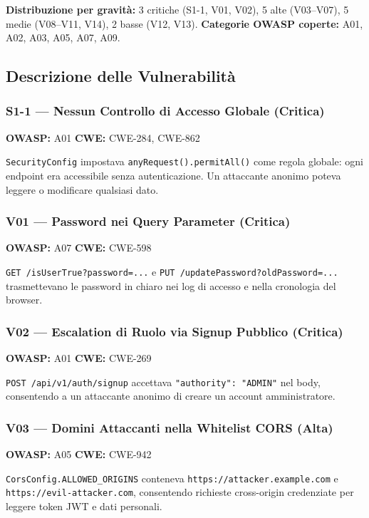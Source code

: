 \documentclass[12pt, a4paper]{article}
\begin{document}
    \textbf{Distribuzione per gravità:} 3 critiche (S1-1, V01, V02),
    5 alte (V03--V07), 5 medie (V08--V11, V14), 2 basse (V12, V13).
    \textbf{Categorie OWASP coperte:} A01, A02, A03, A05, A07, A09.

    \subsection{Descrizione delle Vulnerabilità}

    \subsubsection{S1-1 --- Nessun Controllo di Accesso Globale (Critica)}
    \textbf{OWASP:} A01 \textbar{} \textbf{CWE:} CWE-284, CWE-862

    \texttt{SecurityConfig} impostava \texttt{anyRequest().permitAll()} come regola
    globale: ogni endpoint era accessibile senza autenticazione. Un attaccante anonimo
    poteva leggere o modificare qualsiasi dato.

    \subsubsection{V01 --- Password nei Query Parameter (Critica)}
    \textbf{OWASP:} A07 \textbar{} \textbf{CWE:} CWE-598

    \texttt{GET /isUserTrue?password=...} e \texttt{PUT /updatePassword?oldPassword=...}
    trasmettevano le password in chiaro nei log di accesso e nella cronologia del browser.

    \subsubsection{V02 --- Escalation di Ruolo via Signup Pubblico (Critica)}
    \textbf{OWASP:} A01 \textbar{} \textbf{CWE:} CWE-269

    \texttt{POST /api/v1/auth/signup} accettava \texttt{"authority": "ADMIN"} nel body,
    consentendo a un attaccante anonimo di creare un account amministratore.

    \subsubsection{V03 --- Domini Attaccanti nella Whitelist CORS (Alta)}
    \textbf{OWASP:} A05 \textbar{} \textbf{CWE:} CWE-942

    \texttt{CorsConfig.ALLOWED\_ORIGINS} conteneva \texttt{https://attacker.example.com}
    e \texttt{https://evil-attacker.com}, consentendo richieste cross-origin credenziate
    per leggere token JWT e dati personali.
\end{document}
